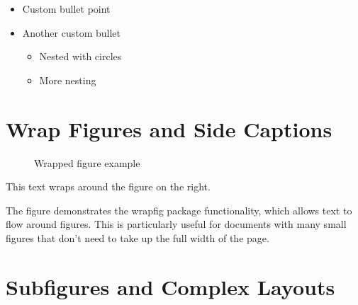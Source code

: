 \documentclass[11pt,a4paper]{article}
\theoremstyle{definition}
\begin{document}
\begin{itemize}[label=$\triangleright$]
    \item Custom bullet point
    \item Another custom bullet
    \begin{itemize}[label=$\circ$]
        \item Nested with circles
        \item More nesting
    \end{itemize}
\end{itemize}

\section{Wrap Figures and Side Captions}

\begin{wrapfigure}{r}{0.4\textwidth}
\centering
{}
\caption{Wrapped figure example}
\label{fig:wrap}
\end{wrapfigure}

This text wraps around the figure on the right. \lipsum[1]

The figure demonstrates the wrapfig package functionality, which allows text to flow around figures. This is particularly useful for documents with many small figures that don't need to take up the full width of the page.

\clearpage

\section{Subfigures and Complex Layouts}
\end{document}
